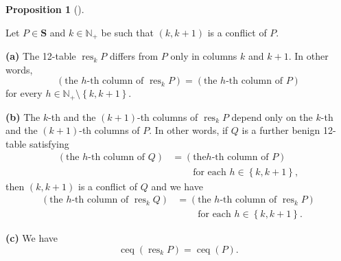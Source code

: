 \documentclass[numbers=enddot,12pt,final,onecolumn,notitlepage]{scrartcl}%
\theoremstyle{definition}
\newtheorem{prop}[theo]{Proposition}
\newenvironment{proposition}[1][]
{\begin{prop}[#1]\begin{leftbar}}
{\end{leftbar}\end{prop}}
\begin{document}
\begin{proposition}
\label{prop.conflict-resolution-props}Let $P\in\mathbf{S}$ and $k\in
\mathbb{N}_{+}$ be such that $\left(  k,k+1\right)  $ is a conflict of $P$.

\textbf{(a)} The 12-table $\operatorname*{res}\nolimits_{k}P$ differs from $P$
only in columns $k$ and $k+1$. In other words,%
\begin{equation}
\left(  \text{the }h\text{-th column of }\operatorname*{res}\nolimits_{k}%
P\right)  =\left(  \text{the }h\text{-th column of }P\right)
\label{pf.lem.BK.res.loc}%
\end{equation}
for every $h\in\mathbb{N}_{+}\setminus\left\{  k,k+1\right\}  $.

\textbf{(b)} The $k$-th and the $\left(  k+1\right)  $-th columns of
$\operatorname*{res}\nolimits_{k}P$ depend only on the $k$-th and the $\left(
k+1\right)  $-th columns of $P$. In other words, if $Q$ is a further benign
12-table satisfying%
\begin{align*}
\left(  \text{the }h\text{-th column of }Q\right)   &  =\left(  \text{the
}h\text{-th column of }P\right) \\
&  \ \ \ \ \ \ \ \ \ \ \text{for each }h\in\left\{  k,k+1\right\}  ,
\end{align*}
then $\left(  k,k+1\right)  $ is a conflict of $Q$ and we have%
\begin{align}
\left(  \text{the }h\text{-th column of }\operatorname*{res}\nolimits_{k}%
Q\right)   &  =\left(  \text{the }h\text{-th column of }\operatorname*{res}%
\nolimits_{k}P\right) \label{pf.lem.BK.res.loc2}\\
&  \ \ \ \ \ \ \ \ \ \ \text{for each }h\in\left\{  k,k+1\right\}  .\nonumber
\end{align}


\textbf{(c)} We have%
\begin{equation}
\operatorname*{ceq}\left(  \operatorname*{res}\nolimits_{k}P\right)
=\operatorname*{ceq}\left(  P\right)  . \label{pf.lem.BK.res.ceq}%
\end{equation}



\end{proposition}
\end{document}
